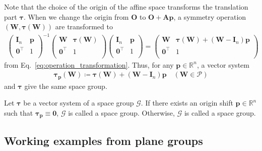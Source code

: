 Note that the choice of the origin of the affine space transforms the translation part $\bm{\tau}$.
When we change the origin from $\bm{O}$ to $\bm{O} + \bm{Ap}$, a symmetry operation $(\bm{W}, \bm{\tau}(\bm{W}))$ are transformed to
\begin{align*}
  \begin{pmatrix}
    \bm{I}_{n} & \bm{p} \\
    \bm{0}^{\top} & 1 \\
  \end{pmatrix}^{-1}
  \begin{pmatrix}
    \bm{W} & \bm{\tau}(\bm{W}) \\
    \bm{0}^{\top} & 1 \\
  \end{pmatrix}
  \begin{pmatrix}
    \bm{I}_{n} & \bm{p} \\
    \bm{0}^{\top} & 1 \\
  \end{pmatrix}
  =
  \begin{pmatrix}
    \bm{W} & \bm{\tau}(\bm{W}) + (\bm{W} - \bm{I}_{n})\bm{p} \\
    \bm{0}^{\top} & 1 \\
  \end{pmatrix}
\end{align*}
from Eq.~\eqref{eq:operation_transformation}.
Thus, for any $\bm{p} \in \mathbb{R}^{n}$, a vector system
\begin{align}
  \bm{\tau}_{\bm{p}}(\bm{W})
    \coloneqq \bm{\tau}(\bm{W}) + (\bm{W} - \bm{I}_{n}) \bm{p}
    \quad (\bm{W} \in \mathcal{P})
\end{align}
and $\bm{\tau}$ give the same space group.

\begin{screen}
  \begin{defn}
    Let $\bm{\tau}$ be a vector system of a space group $\mathcal{G}$.
    If there exists an origin shift $\bm{p} \in \mathbb{R}^{n}$ such that $\bm{\tau}_{\bm{p}} \equiv \bm{0}$, $\mathcal{G}$ is called a  space group.
    Otherwise, $\mathcal{G}$ is called a  space group.
  \end{defn}
\end{screen}

\subsection{Working examples from plane groups}

